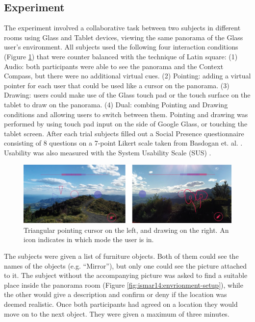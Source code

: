 \subsection{Experiment}

The experiment involved a collaborative task between two subjects in different rooms using Glass and Tablet devices, viewing the same panorama of the Glass user's environment. All subjects used the following four interaction conditions (Figure \ref{fig:ismar14:pointing-drawing}) that were counter balanced with the technique of Latin square: 
(1) Audio: both participants were able to see the panorama and the Context Compass, but there were no additional virtual cues. 
(2) Pointing: adding a virtual pointer for each user that could be used like a cursor on the panorama.
(3) Drawing: users could make use of the Glass touch pad or the touch surface on the tablet to draw on the panorama. 
(4) Dual: combing Pointing and Drawing conditions and allowing users to switch between them.
Pointing and drawing was performed by using touch pad input on the side of Google Glass, or touching the tablet screen. After each trial subjects filled out a Social Presence questionnaire consisting of 8 questions on a 7-point Likert scale taken from Basdogan et. al. \cite{Basdogan2001}. Usability was also measured with the System Usability Scale (SUS) \cite{brooke1996sus}.

\begin{figure}[ht]
	\centering
	\includegraphics[width=\linewidth]{images/ismar14/pointing-drawing}
	\caption{Triangular pointing cursor on the left, and drawing on the right. An icon indicates in which mode the user is in.}
	\label{fig:ismar14:pointing-drawing}
\end{figure}

The subjects were given a list of furniture objects. Both of them could see the names of the objects (e.g. “Mirror”), but only one could see the picture attached to it. The subject without the accompanying picture was asked to find a suitable place inside the panorama room (Figure \ref{fig:ismar14:envrionment-setup}), while the other would give a description and confirm or deny if the location was deemed realistic. Once both participants had agreed on a location they would move on to the next object. They were given a maximum of three minutes.

